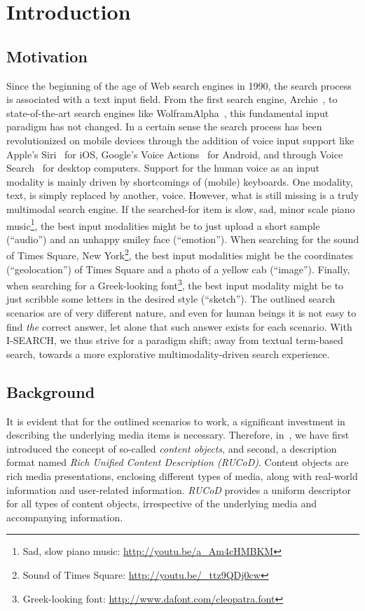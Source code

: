 \documentclass{acm_proc_article-sp}
\let\oldemph\emph
\renewcommand{\emph}[1]{\oldemph{\fontsize{9}{9}\selectfont #1}}
\newcommand{\inlinelistingsize}{\fontsize{8pt}{11pt}}
\let\oldurl\url
\renewcommand{\url}[1]{\inlinelistingsize\oldurl{#1}}
\begin{document}
\section{Introduction}
\subsection{Motivation}
Since the beginning of the age of Web search engines in 1990, the search process is associated with a text input field.
From the first search engine, Archie~\cite{archie}, to state-of-the-art search engines like WolframAlpha~\cite{wolframalpha}, this fundamental input paradigm has not changed.
In a certain sense the search process has been revolutionized on mobile devices through the addition of voice input support like Apple's Siri~\cite{siri} for iOS, Google's Voice Actions~\cite{voiceactions} for Android, and through Voice Search~\cite{voicesearch} for desktop computers.
Support for the human voice as an input modality is mainly driven by shortcomings of (mobile) keyboards.
One modality, text, is simply replaced by another, voice.
However, what is still missing is a truly multimodal search engine.
If the searched-for item is slow, sad, minor scale piano music\footnote{Sad, slow piano music: \url{http://youtu.be/a_Am4cHMBKM}}, the best input modalities might be to just upload a short sample (``audio'') and an unhappy smiley face (``emotion'').
When searching for the sound of Times Square, New York\footnote{Sound of Times Square: \url{http://youtu.be/_ttz9QDj0cw}}, the best input modalities might be the coordinates (``geolocation'') of Times Square and a photo of a yellow cab (``image'').
Finally, when searching for a Greek-looking font\footnote{Greek-looking font: \url{http://www.dafont.com/cleopatra.font}}, the best input modality might be to just scribble some letters in the desired style (``sketch'').
The outlined search scenarios are of very different nature, and even for human beings it is not easy to find \emph{the} correct answer, let alone that such answer exists for each scenario.
With \mbox{I-SEARCH}, we thus strive for a paradigm shift; away from textual term-based search, towards a more explorative multimodality-driven search experience.

\subsection{Background}
It is evident that for the outlined scenarios to work, a significant investment in describing the underlying media items is necessary.
Therefore, in~\cite{ijmis2010}, we have first introduced the concept of so-called \emph{content objects}, and second, a description format named \emph{Rich Unified Content Description (RUCoD)}.
Content objects are rich media presentations, enclosing different types of media, along with real-world information and user-related information.
\emph{RUCoD} provides a uniform descriptor for all types of content objects, irrespective of the underlying media and accompanying information.
\end{document}
